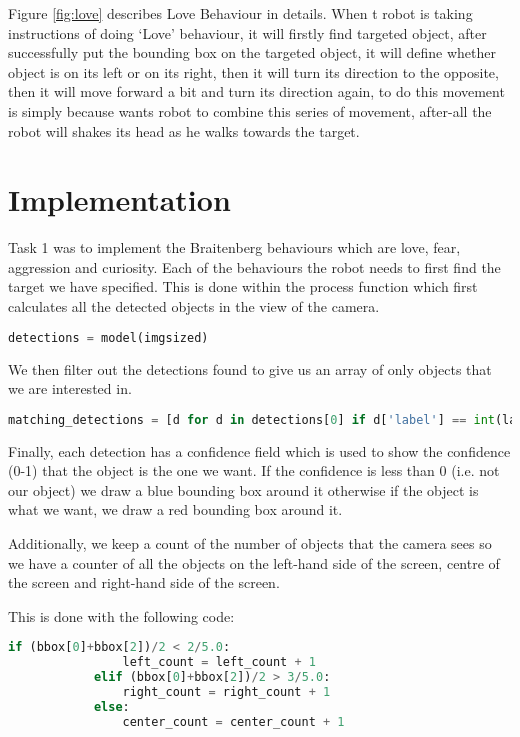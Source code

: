 Figure \ref{fig:love} describes Love Behaviour in details.
When t robot is taking instructions of doing ‘Love’ behaviour, it will firstly find targeted object, after successfully put the bounding box on the targeted object, it will define whether object is on its left or on its right, then it will turn its direction to the opposite, then it will move forward a bit and turn its direction again, to do this movement is simply because wants robot to combine this series of movement, after-all the robot will shakes its head as he walks towards the target.

\section{Implementation}
Task 1 was to implement the Braitenberg behaviours which are love, fear, aggression and curiosity. 
Each of the behaviours the robot needs to first find the target we have specified. This is done within the process function which first calculates all the detected objects in the view of the camera. 

\begin{lstlisting}[language=Python]
detections = model(imgsized)
\end{lstlisting}

We then filter out the detections found to give us an array of only objects that we are interested in. 

\begin{lstlisting}[language=Python]
matching_detections = [d for d in detections[0] if d['label'] == int(label_widget.value)]
\end{lstlisting}

Finally, each detection has a confidence field which is used to show the confidence (0-1) that the object is the one we want. If the confidence is less than 0 (i.e. not our object) we draw a blue bounding box around it otherwise if the object is what we want, we draw a red bounding box around it. 

Additionally, we keep a count of the number of objects that the camera sees so we have a counter of all the objects on the left-hand side of the screen, centre of the screen and right-hand side of the screen. 

This is done with the following code:
\begin{lstlisting}[language=Python]
if (bbox[0]+bbox[2])/2 < 2/5.0:
                left_count = left_count + 1
            elif (bbox[0]+bbox[2])/2 > 3/5.0:
                right_count = right_count + 1
            else:
                center_count = center_count + 1
\end{lstlisting}

